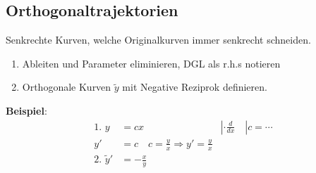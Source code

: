 \subsection{Orthogonaltrajektorien}
Senkrechte Kurven, welche Originalkurven immer senkrecht schneiden.
\begin{enumerate}[nosep]
	\item Ableiten und Parameter eliminieren, DGL als r.h.s notieren 
	\item Orthogonale Kurven $\tilde{y}$ mit Negative Reziprok definieren.
\end{enumerate}

\noindent\textbf{Beispiel}:
\begin{align*}
	\text{1. } y &= cx & | \cdot \frac{d}{dx}\quad | c=\cdots\\
	y' &= c \quad c = \frac{y}{x} \Rightarrow y' = \frac{y}{x}\\
	\text{2. } \tilde{y}' &= -\frac{x}{y}
\end{align*}

